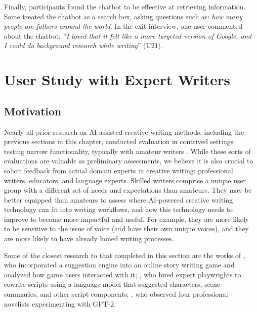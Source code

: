 Finally, participants found the chatbot to be effective at retrieving information. Some treated the chatbot as a search box, asking questions such as: \textit{how many people are fathers around the world}. In the exit interview, one user commented about the chatbot: ''\textit{I loved that it felt like a more targeted version of Google, and I could do background research while writing}'' (U21).

\section{User Study with Expert Writers}


\subsection{Motivation}

Nearly all prior research on AI-assisted creative writing methods, including the previous sections in this chapter, conducted evaluation in contrived settings testing narrow functionality, typically with amateur writers \citep{lark2018creative,yuan2022wordcraft,roemmele2015creative,roemmele2021inspiration,nichols2020collaborative}.
While these sorts of evaluations are valuable as preliminary assessments, we believe it is also crucial to solicit feedback from actual domain experts in creative writing: professional writers, educators, and language experts.
Skilled writers comprise a unique user group with a different set of needs and expectations than amateurs.
They may be better equipped than amateurs to assess where AI-powered creative writing technology can fit into writing workflows, and how this technology needs to improve to become more impactful and useful.
For example, they are more likely to be sensitive to the issue of voice (and have their own unique voices), and they are more likely to have already honed writing processes.

Some of the closest research to that completed in this section are the works of \citet{akoury2020storium}, who incorporated a suggestion engine into an online story writing game and analyzed how game users interacted with it; \citet{mirowski2022co}, who hired expert playwrights to cowrite scripts using a language model that suggested characters, scene summaries, and other script components; \citet{calderwood2020novelists}, who observed four professional novelists experimenting with GPT-2.

